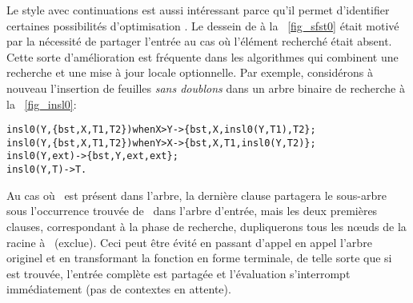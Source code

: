  Le style
avec continuations est aussi intéressant parce qu'il permet
d'identifier certaines possibilités d'optimisation
\citep{Danvy_2004}. Le dessein de  à la
\fig~\vref{fig_sfst0} était motivé par la nécessité de partager
l'entrée au cas où l'élément recherché était absent. Cette sorte
d'amélioration est fréquente dans les algorithmes qui combinent une
recherche et une mise à jour locale optionnelle. Par exemple,
considérons à nouveau l'insertion de feuilles \emph{sans doublons}
dans un arbre binaire de recherche à
la \fig~\vref{fig_insl0}:
\begin{alltt}
insl0(Y,\{bst,X,T1,T2\}) when X > Y -> \{bst,X,insl0(Y,T1),T2\};
insl0(Y,\{bst,X,T1,T2\}) when Y > X -> \{bst,X,T1,insl0(Y,T2)\};
insl0(Y,          ext)            -> \{bst,Y,ext,ext\};
insl0(Y,            T)            -> T.
\end{alltt}
Au cas où ~est présent dans l'arbre, la dernière clause
partagera le sous-arbre sous l'occurrence trouvée de~ dans
l'arbre d'entrée, mais les deux premières clauses, correspondant à la
phase de recherche, dupliquerons tous les n{\oe}uds de la racine
à~ (exclue). Ceci peut être évité en passant d'appel en
appel l'arbre originel et en transformant la fonction en forme
terminale, de telle sorte que si~ est trouvée, l'entrée
complète est partagée et l'évaluation s'interrompt immédiatement (pas
de contextes en attente).

